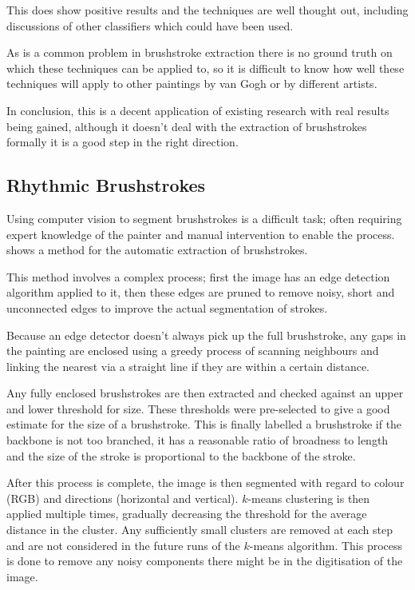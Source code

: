 \documentclass[conference]{IEEEtran}
\begin{document}
This does show positive results and the techniques are well thought out,
including discussions of other classifiers which could have been used.

As is a common problem in brushstroke extraction there is no ground truth on
which these techniques can be applied to, so it is difficult to know how well
these techniques will apply to other paintings by van Gogh or by different
artists.

In conclusion, this is a decent application of existing research with real
results being gained, although it doesn't deal with the extraction of
brushstrokes formally it is a good step in the right direction.

\subsection{Rhythmic Brushstrokes}

Using computer vision to segment brushstrokes is a difficult task; often
requiring expert knowledge of the painter and manual intervention to enable the
process. \cite{jia12rhythmic} shows a method for the automatic extraction of
brushstrokes.

This method involves a complex process; first the image has an edge detection
algorithm applied to it, then these edges are pruned to remove noisy, short and
unconnected edges to improve the actual segmentation of strokes.

Because an edge detector doesn't always pick up the full brushstroke, any gaps
in the painting are enclosed using a greedy process of scanning neighbours and
linking the nearest via a straight line if they are within a certain distance.

Any fully enclosed brushstrokes are then extracted and checked against an upper
and lower threshold for size. These thresholds were pre-selected to give a good
estimate for the size of a brushstroke. This is finally labelled a brushstroke
if the backbone is not too branched, it has a reasonable ratio of broadness to
length and the size of the stroke is proportional to the backbone of the
stroke.

After this process is complete, the image is then segmented with regard to
colour (\gls{RGB}) and directions (horizontal and vertical). $k$-means
clustering is then applied multiple times, gradually decreasing the threshold
for the average distance in the cluster. Any sufficiently small clusters are
removed at each step and are not considered in the future runs of the $k$-means
algorithm. This process is done to remove any noisy components there might be
in the digitisation of the image.
\end{document}
